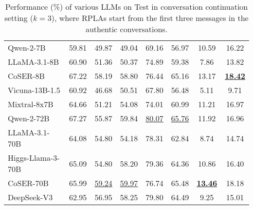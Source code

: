 \begin{table*}[htbp]
{\begin{tabular}{lccccccc}
Qwen-2-7B & 59.81 & 49.87 & 49.04 & 69.16 & 56.97 & 10.59 & 16.22 \\
LLaMA-3.1-8B & 60.90 & 51.36 & 50.37 & 74.89 & 59.38 & 7.86 & 13.82 \\
CoSER-8B & 67.22 & 58.19 & 58.80 & 76.44 & 65.16 & 13.17 & \underline{\textbf{18.42}} \\
Vicuna-13B-1.5 & 60.92 & 46.68 & 50.51 & 67.80 & 56.48 & 5.11 & 9.71 \\
Mixtral-8x7B & 64.66 & 51.21 & 54.08 & 74.01 & 60.99 & 11.21 & 16.97 \\
Qwen-2-72B & 67.27 & 55.87 & 59.84 & \underline{80.07} & \underline{65.76} & 11.92 & 16.96 \\
LLaMA-3.1-70B & 64.08 & 54.80 & 54.18 & 78.31 & 62.84 & 8.74 & 14.74 \\
Higgs-Llama-3-70B & 65.09 & 54.80 & 58.20 & 79.36 & 64.36 & 10.86 & 16.40 \\
CoSER-70B & 65.99 & \underline{59.24} & \underline{59.97} & 76.74 & 65.48 & \underline{\textbf{13.46}} & 18.18 \\
DeepSeek-V3 & 62.95 & 56.95 & 58.25 & 79.80 & 64.49 & 9.25 & 15.01 \\
\bottomrule
\end{tabular}}
\caption{Performance (\%) of various LLMs on \method Test  in conversation continuation setting ($k=3$), where RPLAs start from the first three messages in the authentic conversations.}
\label{tab:model-comparison-cf3}
\end{table*}

